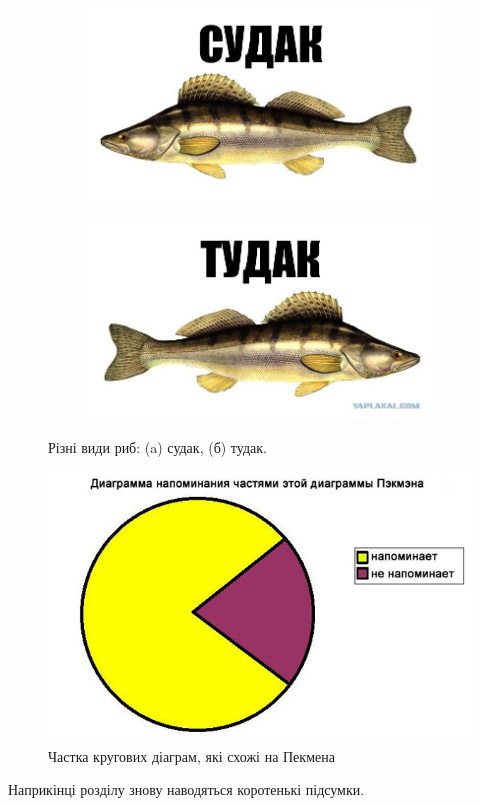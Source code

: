 \begin{figure}[ht]
\centering
    \begin{subfigure}[b]{0.5\textwidth}    
        \includegraphics[scale=0.3]{Images/Sudak.png}
        \caption{}
    \end{subfigure}%
    \begin{subfigure}[b]{0.5\textwidth}
        \includegraphics[scale=0.3]{Images/Tudak.png}
        \caption{}
    \end{subfigure}
 
    \caption{Різні види риб: (a) судак, (б) тудак.}
    \label{fig_sudak}
\end{figure}

\begin{figure}[ht]
        \centering
        \includegraphics[scale=0.5]{Images/Pacman.jpg}
        \caption{Частка кругових діаграм, які схожі на Пекмена}
        \label{fig_pacman}
\end{figure}

\chapconclude{\ref{chap:theory}}

Наприкінці розділу знову наводяться коротенькі підсумки.